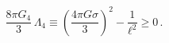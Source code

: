 \begin{equation}
\frac{8\pi G_4}{3}\,\Lambda_4 \equiv \left(\frac{4\pi G\sigma}{3}\right)^2-
\frac{1}{\ell^2}\geq 0\,.\end{equation}

